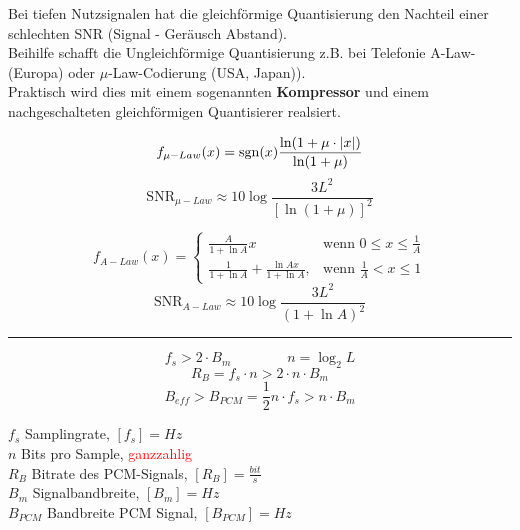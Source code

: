 \newpage
{}
Bei tiefen Nutzsignalen hat die gleichförmige Quantisierung den Nachteil einer schlechten SNR
(Signal - Geräusch Abstand). \\
Beihilfe schafft die Ungleichförmige Quantisierung z.B. bei Telefonie
A-Law-(Europa) oder $\mu$-Law-Codierung (USA, Japan)). \\
Praktisch wird dies mit einem sogenannten \textbf{Kompressor} und einem nachgeschalteten
gleichförmigen Quantisierer realsiert.

\begin{minipage}{9cm}
$$ f_{\mu-Law}(x) = \operatorname{sgn}(x) \frac{\ln(1+\mu\cdot|x|)}{\ln(1+\mu)}$$
$$\text{SNR}_{\mu-Law} \approx 10 \log \dfrac{3 L^2}{[\ln(1 + \mu)]^2}$$
\end{minipage}
\begin{minipage}{9cm}
$$f_{A-Law}(x)=\begin{cases} \frac{A}{1+ \ln A} x & \mbox{wenn }0 \le x \le \frac{1}{A} \\
	\frac{1}{1+ \ln A} + \frac{\ln Ax}{1+ \ln A}, & \mbox{wenn } \frac{1}{A} < x \le 1 \end{cases} $$
$$\text{SNR}_{A-Law} \approx 10 \log \dfrac{3 L^2}{(1+\ln A)^2}$$
\end{minipage}
\hrule


\begin{minipage}{9cm}
	$$ f_s > 2 \cdot B_m  \qquad \qquad n = \log_2 L$$ 
	$$ R_B = f_s \cdot n > 2 \cdot n \cdot B_m $$ 
	$$ B_{eff} > B_{PCM} = \frac{1}{2} n \cdot f_s > n \cdot B_m$$
\end{minipage}
\begin{minipage}{9cm}
	$f_s$ Samplingrate, $[f_s] = Hz$ \\
	$n$ Bits pro Sample, \textcolor{red}{ganzzahlig} \\
	$R_B$ Bitrate des PCM-Signals, $[R_B] = \frac{bit}{s}$ \\
	$B_m$ Signalbandbreite, $[B_m] = Hz $ \\
	$B_{PCM}$ Bandbreite PCM Signal, $[B_{PCM}] = Hz $
\end{minipage}


